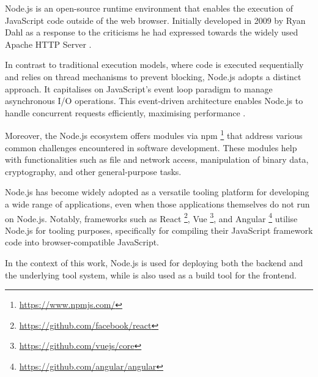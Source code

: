 Node.js is an open-source runtime environment that enables the execution of
JavaScript code outside of the web browser. Initially developed in 2009 by Ryan
Dahl as a response to the criticisms he had expressed towards the widely used
Apache HTTP Server \cite{ryan-dahl-nodejs}.

In contrast to traditional execution models, where code is executed
sequentially and relies on thread mechanisms to prevent blocking, Node.js
adopts a distinct approach. It capitalises on JavaScript's event loop
\cite{javascript-event-loop} paradigm to manage asynchronous I/O operations.
This event-driven architecture enables Node.js to handle concurrent requests
efficiently, maximising performance \cite{nodejs-event-loop}.

Moreover, the Node.js ecosystem offers modules via npm
\footnote{\url{https://www.npmjs.com/}} that address various common challenges
encountered in software development. These modules help with functionalities
such as file and network access, manipulation of binary data, cryptography, and
other general-purpose tasks.

Node.js has become widely adopted as a versatile tooling platform for
developing a wide range of applications, even when those applications
themselves do not run on Node.js. Notably, frameworks such as React
\footnote{\url{https://github.com/facebook/react}}, Vue
\footnote{\url{https://github.com/vuejs/core}}, and Angular
\footnote{\url{https://github.com/angular/angular}} utilise Node.js for tooling
purposes, specifically for compiling their JavaScript framework code into
browser-compatible JavaScript.

In the context of this work, Node.js is used for deploying both the backend and
the underlying tool system, while is also used as a build tool for the
frontend.
